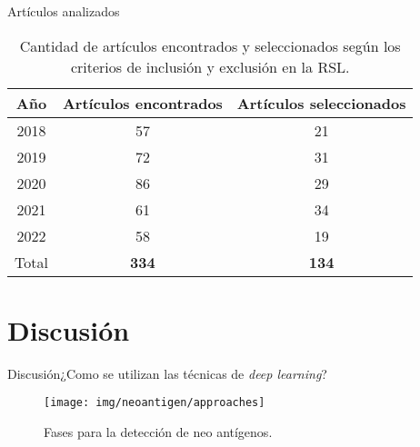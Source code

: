 \documentclass[10pt]{beamer}
\newcommand{\1}{
	\setbeamertemplate{background}{
		\texttt{[image: img/1]}
		\tikz[overlay] \fill[fill opacity=0.75,fill=white] (0,0) rectangle (-\paperwidth,\paperheight);
	}
}
\begin{document}
\begin{frame}{Artículos analizados}{}
	
	\begin{table}[H]
		\begin{center}
			\caption{Cantidad de artículos encontrados y seleccionados según los criterios de inclusión y exclusión en la RSL.}
			\label{tab:number_papers}
			\setlength{\tabcolsep}{0.5em} %
			{\renewcommand{\arraystretch}{1.2}%
				\begin{tabular}{ccc}
					\textbf{Año} & \textbf{Artículos encontrados} & \textbf{Artículos seleccionados}\\ \hline
					2018 & 57 & 21 \\
					2019 & 72 & 31 \\
					2020 & 86 & 29 \\
					2021 & 61 & 34 \\
					2022 & 58 & 19 \\ \hline
					Total & \textbf{334} & \textbf{134} \\
				\end{tabular}
			}
		\end{center}
	\end{table}
	
\end{frame}



\section{Discusión}

\begin{frame}{Discusión}{¿Como se utilizan las técnicas de \textit{deep learning}?}
	
	\begin{figure}
		\texttt{[image: img/neoantigen/approaches]}
		\caption{Fases para la detección de neo antígenos.}
	\end{figure}

\end{frame}
\end{document}
